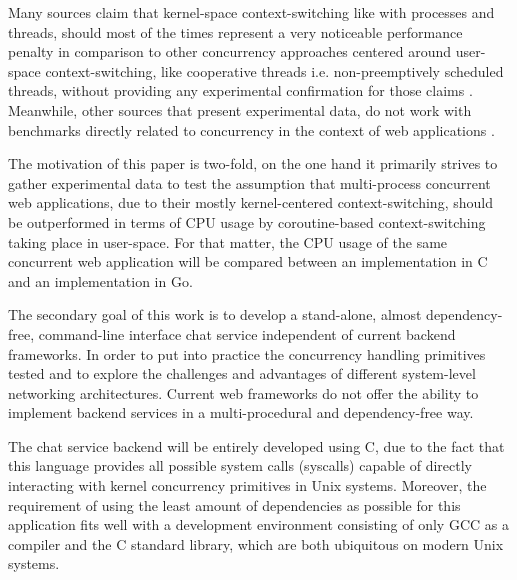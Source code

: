 Many sources claim that kernel-space context-switching like with processes and threads, should most of the times represent a very noticeable performance penalty in comparison to other concurrency approaches centered around user-space context-switching, like cooperative threads i.e. non-preemptively scheduled threads, without providing any experimental confirmation for those claims \cite{2003Events}\cite{2005Threads}\cite{Cox-Buday2017}\cite{Kerrisk2010}. Meanwhile, other sources that present experimental data, do not work with benchmarks directly related to concurrency in the context of web applications \cite{2013ContextSwitching}. 

The motivation of this paper is two-fold, on the one hand it primarily strives to gather experimental data to test the assumption that multi-process concurrent web applications, due to their mostly kernel-centered context-switching, should be outperformed in terms of CPU usage by coroutine-based context-switching taking place in user-space. For that matter, the CPU usage of the same concurrent web application will be compared between an implementation in C and an implementation in Go.

The secondary goal of this work is to develop a stand-alone, almost dependency-free, command-line interface chat service independent of current backend frameworks. In order to put into practice the concurrency handling primitives tested and to explore the challenges and advantages of different system-level networking architectures. Current web frameworks do not offer the ability to implement backend services in a multi-procedural and dependency-free way. 

The chat service backend will be entirely developed using C, due to the fact that this language provides all possible system calls (syscalls) capable of directly interacting with kernel concurrency primitives in Unix systems. Moreover, the requirement of using the least amount of dependencies as possible for this application fits well with a development environment consisting of only GCC as a compiler and the C standard library, which are both ubiquitous on modern Unix systems. 

